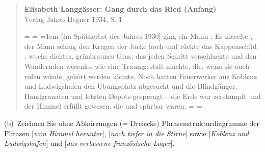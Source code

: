 \begin{quote}\onehalfspacing
   \textbf{Elisabeth Langgässer: Gang durch das Ried (Anfang)}\\
   {\footnotesize Verlag Jakob Hegner 1934, S. 1 }

  \begin{linenumbers}
  \newdimen\origiwspc%
  \newdimen\origiwstr%
  \origiwspc=\font
  \origiwstr=\font
  \font=1em
  {[Im Spätherbst des Jahres 1930]} ging ein Mann . Es nieselte  , der Mann schlug den Kragen der Jacke hoch und rückte das Kappenschild .  wuchs dichtes, grünbraunes Gras, das jeden Schritt verschluckte und den Wandernden wesenlos wie eine Traumgestalt machte, die, wenn sie auch rufen würde,  gehört werden könnte. Noch  hatten  Feuerwerker aus Koblenz und Ludwigshafen den Übungsplatz abgesucht und die Blindgänger, Handgranaten und letzten Depots gesprengt – die Erde war  zerstampft und der Himmel  erfüllt gewesen, die  und  spürbar waren.
  \font=\origiwspc
  \font=\origiwstr
  \end{linenumbers}
\end{quote}

(b)~Zeichnen Sie ohne Abkürzungen (= Dreiecke) Phrasenstrukturdiagramme der Phrasen [\textit{vom Himmel herunter}], [\textit{noch tiefer in die Stirne}] sowie [\textit{Koblenz und Ludwigshafen}] und [\textit{das verlassene französische Lager}].


